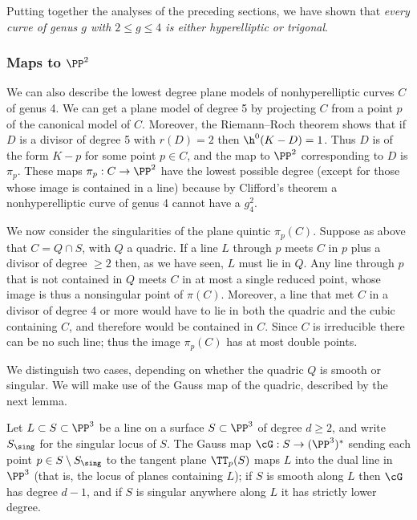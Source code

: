 Putting together
the analyses of the preceding sections, we have shown that
%
\emph{every curve of genus $g$ with $2\leq g \leq 4$ is either hyperelliptic or trigonal}.

\subsubsection*{Maps to $\PP^2$}

We can also describe the lowest degree plane models of nonhyperelliptic curves $C$ of genus 4.
We can get a plane model of degree 5 by projecting $C$ from a point $p$ of the canonical model of $C$.
Moreover, the
Riemann--Roch theorem
%
shows that if $D$ is a divisor of
degree 5 with $r(D)=2$ then
$\h^0(K-D) = 1$. Thus $D$ is of the form
$K-p$ for some point $p \in C$, and the map to $\PP^2$ corresponding
to $D$ is $\pi_p$. These  maps $\pi_p: C\to \PP^2$ have the lowest
possible degree (except for those whose image is  contained in a line)
because by
Clifford's theorem
%
a nonhyperelliptic curve of genus 4
cannot have a $g^2_4$.

We now consider the singularities of the
plane quintic
%
$\pi_p(C)$.
Suppose as above that $C = Q\cap S$, with $Q$ a quadric. If a line $L$
through $p$ meets $C$ in $p$ plus a divisor of degree $\geq 2$ then,
as we have seen, $L$ must lie in $Q$.  Any line through $p$ that is
not contained in $Q$ meets $C$ in at most a single reduced point,
whose image is thus a nonsingular point of $\pi(C)$. Moreover, a line
that met $C$ in a divisor of degree 4 or more
would have to lie in both the quadric and
the cubic containing $C$, and therefore would be contained in $C$.
Since $C$ is irreducible there can be no such line; thus the image
$\pi_p(C)$ has at most double points.

We distinguish two cases, depending on whether
the quadric $Q$ is smooth or singular. We will make use of the
Gauss map
%
of the quadric,
described by the next lemma.

\begin{lemma}
Let $L \subset S \subset \PP^3$ be a line on a surface $S \subset \PP^3$ of degree $d \geq 2$, and
write $S_{\sing}$ for the singular locus of $S$. The Gauss map $\cG :
S \to (\PP^3)^*$ sending each point $p \in S\setminus S_{\sing}$ to
the tangent plane $\TT_p(S)$ maps $L$ into the
dual line
%
%
in $\PP^3$ (that is, the locus of planes containing $L$); if $S$ is
smooth along $L$ then $\cG$  has degree $d-1$, and if $S$ is singular
anywhere along $L$ it has strictly lower degree.
\unif
\end{lemma}

